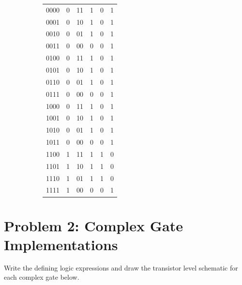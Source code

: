 \documentclass[11pt]{article}
\begin{document}
\begin{enumerate}[label={\bfseries\alph*)}, itemsep=1em]
\begin{figure}[H]
\begin{subfigure}{0.47\textwidth}
{{\begin{tabular}{cccccc}
                \hline
                0000 & 0 & 11 & 1 & 0 & 1 \\
                0001 & 0 & 10 & 1 & 0 & 1 \\
                0010 & 0 & 01 & 1 & 0 & 1 \\
                0011 & 0 & 00 & 0 & 0 & 1 \\
                0100 & 0 & 11 & 1 & 0 & 1 \\
                0101 & 0 & 10 & 1 & 0 & 1 \\
                0110 & 0 & 01 & 1 & 0 & 1 \\
                0111 & 0 & 00 & 0 & 0 & 1 \\
                1000 & 0 & 11 & 1 & 0 & 1 \\
                1001 & 0 & 10 & 1 & 0 & 1 \\
                1010 & 0 & 01 & 1 & 0 & 1 \\
                1011 & 0 & 00 & 0 & 0 & 1 \\
                1100 & 1 & 11 & 1 & 1 & 0 \\
                1101 & 1 & 10 & 1 & 1 & 0 \\
                1110 & 1 & 01 & 1 & 1 & 0 \\
                1111 & 1 & 00 & 0 & 0 & 1 \\
                \hline
            \end{tabular}}%
            }
        \end{subfigure}
\end{figure}
\end{enumerate}
\newpage
\section*{Problem 2: Complex Gate Implementations}
Write the defining logic expressions and draw the transistor level schematic for each complex gate below.
\end{document}
